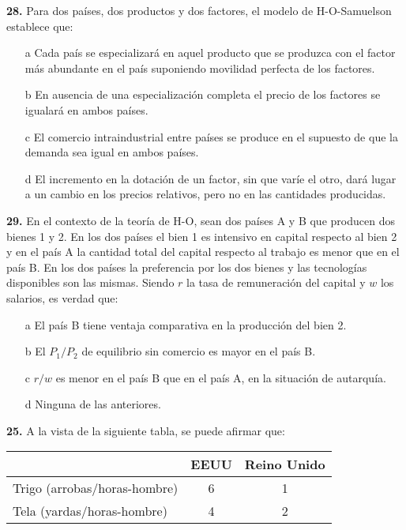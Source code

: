 \documentclass{nuevotema}
\begin{document}

\textbf{28.} Para dos países, dos productos y dos factores, el modelo de H-O-Samuelson establece que:

\begin{enumerate}
	\item[a] Cada país se especializará en aquel producto que se produzca con el factor más abundante en el país suponiendo movilidad perfecta de los factores.
	\item[b] En ausencia de una especialización completa el precio de los factores se igualará en ambos países.
	\item[c] El comercio intraindustrial entre países se produce en el supuesto de que la demanda sea igual en ambos países.
	\item[d] El incremento en la dotación de un factor, sin que varíe el otro, dará lugar a un cambio en los precios relativos, pero no en las cantidades producidas.
\end{enumerate}


\textbf{29.} En el contexto de la teoría de H-O, sean dos países A y B que producen dos bienes 1 y 2. En los dos países el bien 1 es intensivo en capital respecto al bien 2 y en el país A la cantidad total del capital respecto al trabajo es menor que en el país B. En los dos países la preferencia por los dos bienes y las tecnologías disponibles son las mismas. Siendo $r$ la tasa de remuneración del capital y $w$ los salarios, es verdad que:

\begin{enumerate}
	\item[a] El país B tiene ventaja comparativa en la producción del bien 2.
	\item[b] El $P_1/P_2$ de equilibrio sin comercio es mayor en el país B.
	\item[c] $r/w$ es menor en el país B que en el país A, en la situación de autarquía.
	\item[d] Ninguna de las anteriores. 
\end{enumerate}


\textbf{25.} A la vista de la siguiente tabla, se puede afirmar que:

\medskip

\begin{tabular}{l | c | c}
& EEUU & Reino Unido \\ \hline
Trigo (arrobas/horas-hombre) & 6 & 1 \\ \hline
Tela (yardas/horas-hombre) & 4 & 2 \\ \hline
\end{tabular}
\end{document}
